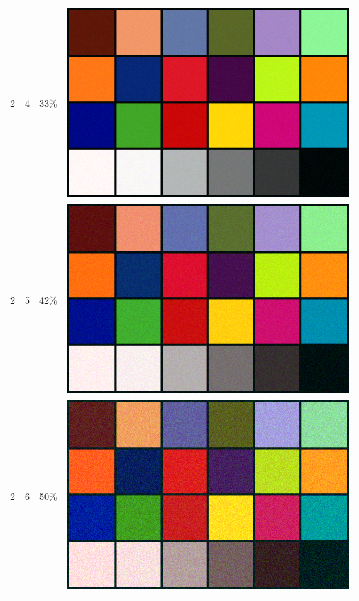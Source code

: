 \documentclass[times, utf8, seminar]{fer}
\begin{document}
\begin{center}
\begin{longtable}{|c|c|c|c|}
2 & 4 &33\% & \includegraphics[scale=0.3]{../benchmark_results/color_chart/2_components-4_bits.png} \\
2 & 5 &42\% & \includegraphics[scale=0.3]{../benchmark_results/color_chart/2_components-5_bits.png} \\
2 & 6 &50\% & \includegraphics[scale=0.3]{../benchmark_results/color_chart/2_components-6_bits.png} \\

\end{longtable}
\end{center}
\end{document}
